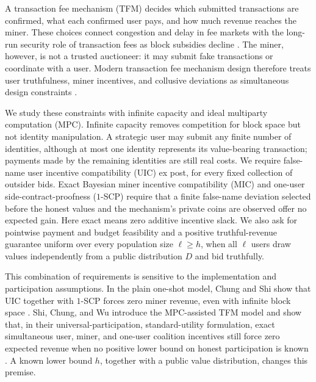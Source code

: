 \documentclass[11pt]{article}
\begin{document}
A transaction fee mechanism (TFM) decides which submitted transactions are
confirmed, what each confirmed user pays, and how much revenue reaches the
miner.  These choices connect congestion and delay in fee markets with the
long-run security role of transaction fees as block subsidies decline
\cite{HubermanLeshnoMoallemi2021Monopoly,CarlstenEtAl2016Instability}.  The
miner, however, is not a trusted auctioneer: it may submit fake transactions
or coordinate with a user.  Modern transaction fee mechanism design therefore
treats user truthfulness, miner incentives, and collusive deviations as
simultaneous design constraints \cite{Roughgarden2024TFM}.

We study these constraints with infinite capacity and ideal multiparty
computation (MPC).  Infinite capacity removes competition for block space but
not identity manipulation.  A strategic user may submit any finite number of
identities, although at most one identity represents its value-bearing
transaction; payments made by the remaining identities are still real costs.
We require false-name user incentive compatibility (UIC) ex post, for every
fixed collection of outsider bids.  Exact Bayesian miner incentive
compatibility (MIC) and one-user side-contract-proofness ($1$-SCP) require that
a finite false-name deviation selected before the honest values and the
mechanism's private coins are observed offer no expected gain.  Here exact
means zero additive incentive slack.  We also ask for pointwise payment and
budget feasibility and a positive truthful-revenue guarantee uniform over
every population size $\ell\ge h$, when all $\ell$ users draw values
independently from a public distribution $D$ and bid truthfully.

This combination of requirements is sensitive to the implementation and
participation assumptions.  In the plain one-shot model, Chung and Shi show
that UIC together with $1$-SCP forces zero miner revenue, even with infinite
block space \cite{ChungShi2023Foundations}.  Shi, Chung, and Wu introduce the
MPC-assisted TFM model and show that, in their universal-participation,
standard-utility formulation, exact simultaneous user, miner, and one-user
coalition incentives still force zero expected revenue when no positive lower
bound on honest participation is known
\cite{shi_et_al:LIPIcs.ITCS.2023.97}.  A known lower bound $h$, together with
a public value distribution, changes this premise.
\end{document}
